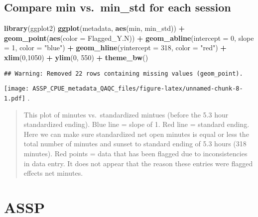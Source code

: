 \documentclass[
]{article}
\newenvironment{Shaded}{\begin{snugshade}}{\end{snugshade}}
\newcommand{\DataTypeTok}[1]{\textcolor[rgb]{0.13,0.29,0.53}{#1}}
\newcommand{\DecValTok}[1]{\textcolor[rgb]{0.00,0.00,0.81}{#1}}
\newcommand{\KeywordTok}[1]{\textcolor[rgb]{0.13,0.29,0.53}{\textbf{#1}}}
\newcommand{\NormalTok}[1]{#1}
\newcommand{\OperatorTok}[1]{\textcolor[rgb]{0.81,0.36,0.00}{\textbf{#1}}}
\newcommand{\StringTok}[1]{\textcolor[rgb]{0.31,0.60,0.02}{#1}}
\begin{document}
\hypertarget{compare-min-vs.-min_std-for-each-session}{%
\subsection{Compare min vs.~min\_std for each
session}\label{compare-min-vs.-min_std-for-each-session}}

\begin{Shaded}
\begin{Highlighting}[]
\KeywordTok{library}\NormalTok{(ggplot2)}
\KeywordTok{ggplot}\NormalTok{(metadata, }\KeywordTok{aes}\NormalTok{(min, min_std)) }\OperatorTok{+}
\StringTok{  }\KeywordTok{geom_point}\NormalTok{(}\KeywordTok{aes}\NormalTok{(}\DataTypeTok{color =}\NormalTok{ Flagged_Y.N)) }\OperatorTok{+}
\StringTok{  }\KeywordTok{geom_abline}\NormalTok{(}\DataTypeTok{intercept =} \DecValTok{0}\NormalTok{, }\DataTypeTok{slope =} \DecValTok{1}\NormalTok{, }\DataTypeTok{color =} \StringTok{"blue"}\NormalTok{) }\OperatorTok{+}
\StringTok{  }\KeywordTok{geom_hline}\NormalTok{(}\DataTypeTok{yintercept =} \DecValTok{318}\NormalTok{, }\DataTypeTok{color =} \StringTok{"red"}\NormalTok{) }\OperatorTok{+}
\StringTok{  }\KeywordTok{xlim}\NormalTok{(}\DecValTok{0}\NormalTok{,}\DecValTok{1050}\NormalTok{) }\OperatorTok{+}\StringTok{ }\KeywordTok{ylim}\NormalTok{(}\DecValTok{0}\NormalTok{, }\DecValTok{550}\NormalTok{) }\OperatorTok{+}
\StringTok{  }\KeywordTok{theme_bw}\NormalTok{()}
\end{Highlighting}
\end{Shaded}

\begin{verbatim}
## Warning: Removed 22 rows containing missing values (geom_point).
\end{verbatim}

\texttt{[image: ASSP\_CPUE\_metadata\_QAQC\_files/figure-latex/unnamed-chunk-8-1.pdf]}
.

\begin{quote}
This plot of minutes vs.~standardized mintues (before the 5.3 hour
standardized ending). Blue line = slope of 1. Red line = standard
ending. Here we can make sure standardized net open minutes is equal or
less the total number of minutes and sunset to standard ending of 5.3
hours (318 minutes). Red points = data that has been flagged due to
inconsistencies in data entry. It does not appear that the reason these
entries were flagged effects net minutes.
\end{quote}

\hypertarget{assp}{%
\section{ASSP}\label{assp}}
\end{document}
